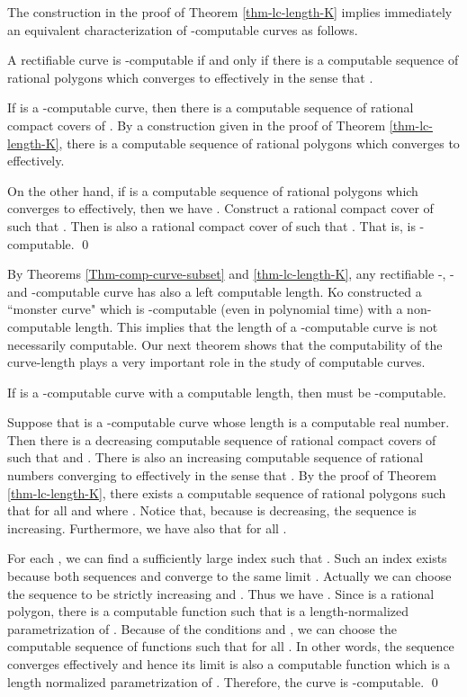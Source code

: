 \documentclass{LMCS}
\theoremstyle{plain}
\begin{document}
The construction in the proof of Theorem \ref{thm-lc-length-K} implies immediately an equivalent characterization of -computable curves as follows.

\begin{cor}\label{cor-K-equivalence}
A rectifiable curve  is -computable if and only if there is a computable sequence  of rational polygons which converges to  effectively in the sense that .
\end{cor}
\proof
If  is a -computable curve, then there is a computable sequence  of rational compact covers of . By a construction given in the proof of Theorem \ref{thm-lc-length-K}, there is a computable sequence  of rational polygons which converges to  effectively.

On the other hand, if  is a computable sequence of rational polygons which converges to  effectively, then we have . Construct a rational compact cover  of  such that . Then  is also a rational compact cover of  such that . That is,  is -computable.
\qed

By Theorems \ref{Thm-comp-curve-subset} and \ref{thm-lc-length-K}, any rectifiable  -, - and -computable curve has also a left computable length. Ko \cite{Ko95a} constructed a ``monster curve" which is -computable (even in polynomial time) with a non-computable length. This implies that the length of a -computable curve is not necessarily computable. Our next theorem shows that the computability of the curve-length plays a very important role in the study of computable curves.

\begin{thm}\label{thm-K+compLengh}
If  is a -computable curve  with a computable length, then  must be -computable.
\end{thm}
\proof
Suppose that  is a -computable curve whose length  is a computable real number. Then there is a decreasing computable sequence  of rational compact covers of  such that  and . There is also an increasing computable sequence  of rational numbers converging to  effectively in the sense that . By the proof of Theorem \ref{thm-lc-length-K}, there exists a computable sequence  of rational polygons such that  for all  and  where . Notice that, because  is decreasing, the sequence  is increasing. Furthermore, we have also that  for all .

For each , we can find a sufficiently large index  such that  . Such an index  exists because both sequences  and  converge to the same limit . Actually we can choose the sequence  to be strictly increasing and . Thus we have .  Since  is a rational polygon, there is a computable function  such that  is a length-normalized parametrization of . Because of the conditions  and , we can choose the computable sequence of functions  such that  for all . In other words, the sequence  converges effectively and hence its limit  is also a computable function which is a length normalized parametrization of . Therefore, the curve  is  -computable.
\qed
\end{document}
